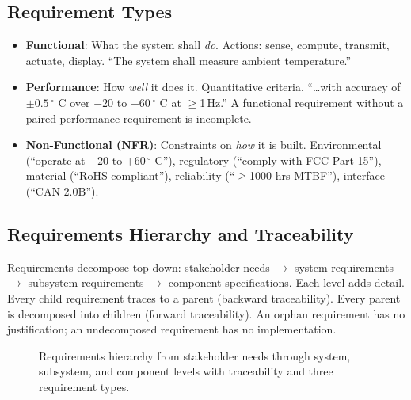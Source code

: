 \subsection{Requirement Types}
\begin{itemize}[leftmargin=1.5em]
\item \textbf{Functional}: What the system shall \emph{do}. Actions: sense, compute, transmit, actuate, display. ``The system shall measure ambient temperature.''
\item \textbf{Performance}: How \emph{well} it does it. Quantitative criteria. ``\ldots with accuracy of $\pm 0.5$\,$^{\circ}$ C over $-20$ to $+60$\,$^{\circ}$ C at $\geq$1\,Hz.'' A functional requirement without a paired performance requirement is incomplete.
\item \textbf{Non-Functional (NFR)}: Constraints on \emph{how} it is built. Environmental (``operate at $-20$ to $+60$\,$^{\circ}$ C''), regulatory (``comply with FCC Part 15''), material (``RoHS-compliant''), reliability (``$\geq$1000 hrs MTBF''), interface (``CAN 2.0B'').
\end{itemize}

\subsection{Requirements Hierarchy and Traceability}
Requirements decompose top-down: stakeholder needs $\to$ system requirements $\to$ subsystem requirements $\to$ component specifications. Each level adds detail. Every child requirement traces to a parent (backward traceability). Every parent is decomposed into children (forward traceability). An orphan requirement has no justification; an undecomposed requirement has no implementation.

\begin{figure}[htbp]\centering

\caption{Requirements hierarchy from stakeholder needs through system, subsystem, and component levels with traceability and three requirement types.}\label{fig:hier}
\end{figure}


